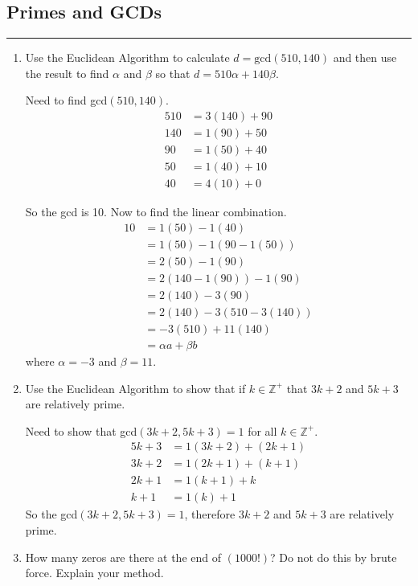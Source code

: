 \documentclass[class=article, crop=false]{standalone}
\def\integers{{\mathbb Z}}
\begin{document}
\subsection{Primes and GCDs}
\hfill {}
\rule{\textwidth}{1pt}
\begin{enumerate}
\item
 Use the Euclidean Algorithm to calculate $d=\mbox{gcd}(510,140)$
  and then use the result to find $\alpha$ and $\beta$ so
  that $d=510\alpha+140\beta$.

  Need to find gcd$(510,140)$.
  \begin{align*}
	510 &= 3(140) + 90 \\
	140 &= 1(90) + 50 \\
	90 &= 1(50) + 40 \\
	50 &= 1(40) + 10 \\
	40 &= 4(10) + 0
  \end{align*}

  So the gcd is 10. Now to find the linear combination.
  \begin{align*}
	10 &= 1(50) - 1(40) \\
	&= 1(50) - 1(90-1(50)) \\
	&= 2(50) - 1(90) \\
	&= 2(140-1(90)) - 1(90) \\
	&= 2(140) -3(90) \\
	&= 2(140) -3(510-3(140)) \\
	&= -3(510) +11(140) \\
	&= \alpha a+ \beta b
  \end{align*}
  where $\alpha = -3$ and $\beta = 11$.

\item
  Use the Euclidean Algorithm to show that if $k\in\integers^+$ that
  $3k+2$ and $5k+3$ are relatively prime.

  Need to show that gcd$(3k+2, 5k+3)=1$ for all $k\in\integers^+$.
  \begin{align*}
	5k+3 &= 1(3k+2) + (2k+1) \\
	3k+2 &= 1(2k+1) + (k+1) \\
	2k+1 &= 1(k+1) + k \\
	k+1 &= 1(k) + 1
  \end{align*}
  So the gcd$(3k+2,5k+3)=1$, therefore $3k+2$ and $5k+3$ are relatively prime.

\item
  How many zeros are there at the end of $(1000!)$?  Do not do this
  by brute force.  Explain your method.


\end{enumerate}
\end{document}
